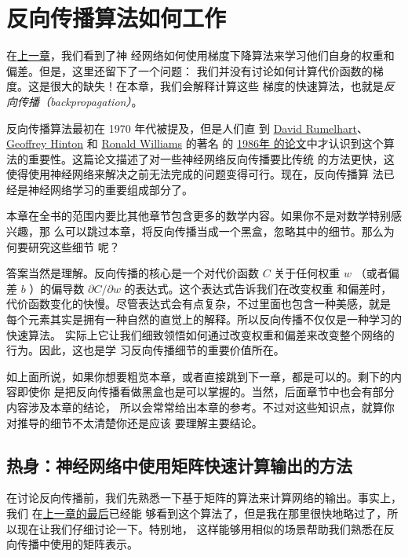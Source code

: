 
\chapter{反向传播算法如何工作}
\label{ch:HowTheBackpropagationAlgorithmWorks}

在\hyperref[ch:UsingNeuralNetsToRecognizeHandwrittenDigits]{上一章}，我们看到了神
经网络如何使用梯度下降算法来学习他们自身的权重和偏差。但是，这里还留下了一个问题：
我们并没有讨论如何计算代价函数的梯度。这是很大的缺失！在本章，我们会解释计算这些
梯度的快速算法，也就是\emph{反向传播（backpropagation）}。

反向传播算法最初在 1970 年代被提及，但是人们直
到 \href{http://en.wikipedia.org/wiki/David_Rumelhart}{David
  Rumelhart}、 \href{http://www.cs.toronto.edu/~hinton/}{Geoffrey
  Hinton} 和 \href{http://en.wikipedia.org/wiki/Ronald_J._Williams}{Ronald
  Williams} 的著名
的 \href{http://www.nature.com/nature/journal/v323/n6088/pdf/323533a0.pdf}{1986年
  的论文}中才认识到这个算法的重要性。这篇论文描述了对一些神经网络反向传播要比传统
的方法更快，这使得使用神经网络来解决之前无法完成的问题变得可行。现在，反向传播算
法已经是神经网络学习的重要组成部分了。

本章在全书的范围内要比其他章节包含更多的数学内容。如果你不是对数学特别感兴趣，那
么可以跳过本章，将反向传播当成一个黑盒，忽略其中的细节。那么为何要研究这些细节
呢？

答案当然是理解。反向传播的核心是一个对代价函数 $C$ 关于任何权重 $w$ （或者偏
差 $b$ ）的偏导数 $\partial C/\partial w$ 的表达式。这个表达式告诉我们在改变权重
和偏差时，代价函数变化的快慢。尽管表达式会有点复杂，不过里面也包含一种美感，就是
每个元素其实是拥有一种自然的直觉上的解释。所以反向传播不仅仅是一种学习的快速算法。
实际上它让我们细致领悟如何通过改变权重和偏差来改变整个网络的行为。因此，这也是学
习反向传播细节的重要价值所在。

如上面所说，如果你想要粗览本章，或者直接跳到下一章，都是可以的。剩下的内容即使你
是把反向传播看做黑盒也是可以掌握的。当然，后面章节中也会有部分内容涉及本章的结论，
所以会常常给出本章的参考。不过对这些知识点，就算你对推导的细节不太清楚你还是应该
要理解主要结论。

\section{热身：神经网络中使用矩阵快速计算输出的方法}
\label{sec:warm_up}

在讨论反向传播前，我们先熟悉一下基于矩阵的算法来计算网络的输出。事实上，我们
在\hyperref[sec:implementing_our_network_to_classify_digits]{上一章的最后}已经能
够看到这个算法了，但是我在那里很快地略过了，所以现在让我们仔细讨论一下。特别地，
这样能够用相似的场景帮助我们熟悉在反向传播中使用的矩阵表示。

